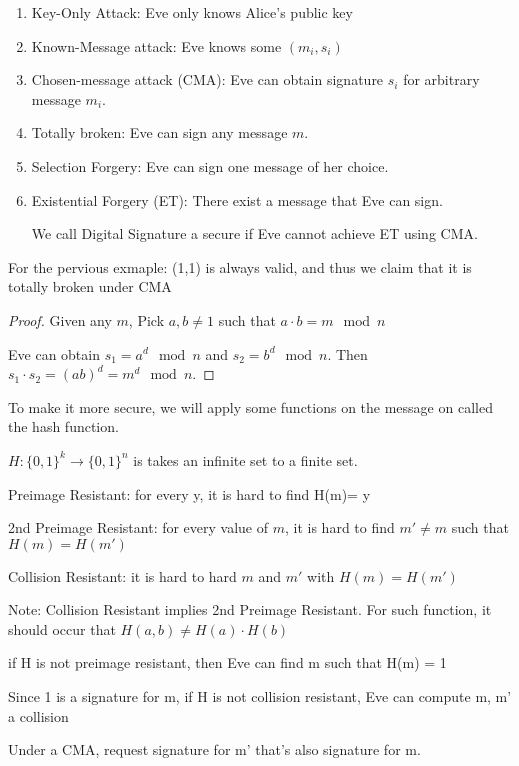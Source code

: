 \begin{enumerate}
\item Key-Only Attack: Eve only knows Alice's public key
\item Known-Message attack: Eve knows some $(m_i,s_i)$
\item Chosen-message attack (CMA): Eve can obtain signature $s_i$ for arbitrary message $m_i$.
\item Totally broken: Eve can sign any message $m$.
\item Selection Forgery: Eve can sign one message of her choice.
\item Existential Forgery (ET): There exist a message that Eve can sign.

\begin{note}
    We call Digital Signature a secure if Eve cannot achieve ET using CMA.
\end{note}
\end{enumerate}

\begin{claim}
    For the pervious exmaple:
    (1,1) is always valid, and thus we claim that it is totally broken under CMA
\end{claim}

\begin{proof}
    Given any $m$, Pick $a, b\neq 1$ such that $a\cdot b = m \mod n$
    
    Eve can obtain $s_1 = a^d \mod n$ and $s_2 = b^d \mod n$. Then $s_1\cdot s_2 = (ab)^d = m^d \mod n$.
\end{proof}

To make it more secure, we will apply some functions on the message on called the hash function.
\begin{exmp}
    $H: \{0, 1\}^k \to \{0, 1\}^n$ is takes an infinite set to a finite set.

    Preimage Resistant: for every y, it is hard to find H(m)= y
    
    2nd Preimage Resistant: for every value of $m$, it is hard to find $m' \neq m$ such that $H(m) = H(m')$
    
    Collision Resistant: it is hard to hard $m$ and $m'$ with $H(m) = H(m')$

    Note: Collision Resistant implies 2nd Preimage Resistant.
    For such function, it should occur that $H(a,b) \neq H(a)\cdot H(b)$
\end{exmp}


\begin{exmp}
    if H is not preimage resistant, then Eve can find m such that H(m) = 1
    
    Since 1 is a signature for m, if H is not collision resistant, Eve can compute m, m' a collision
    
    Under a CMA, request signature for m' that's also signature for m.
\end{exmp}